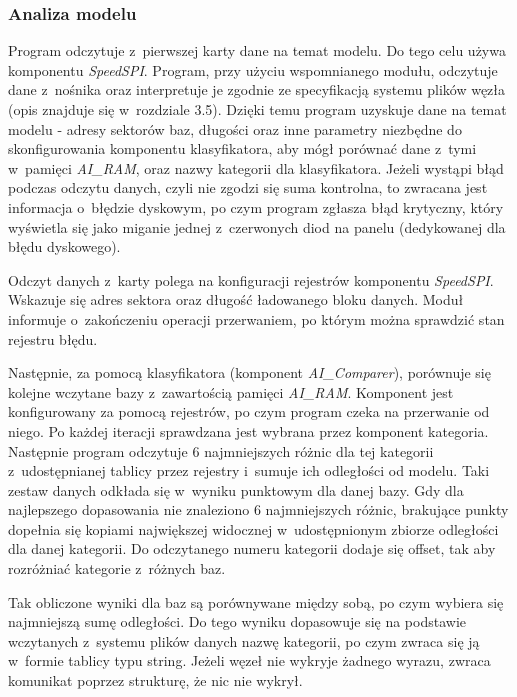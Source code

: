 \subsubsection{Analiza modelu}

Program odczytuje z~pierwszej karty dane na temat modelu. Do tego celu używa komponentu \textit{SpeedSPI}. Program, przy użyciu wspomnianego modułu, odczytuje dane z~nośnika oraz interpretuje je zgodnie ze specyfikacją systemu plików węzła (opis znajduje się w~rozdziale 3.5). Dzięki temu program uzyskuje dane na temat modelu - adresy sektorów baz, długości oraz inne parametry niezbędne do skonfigurowania komponentu klasyfikatora, aby mógł porównać dane z~tymi w~pamięci \textit{AI\_RAM}, oraz nazwy kategorii dla klasyfikatora. Jeżeli wystąpi błąd podczas odczytu danych, czyli nie zgodzi się suma kontrolna, to zwracana jest informacja o~błędzie dyskowym, po czym program zgłasza błąd krytyczny, który wyświetla się jako miganie jednej z~czerwonych diod na panelu (dedykowanej dla błędu dyskowego).

Odczyt danych z~karty polega na konfiguracji rejestrów komponentu \textit{SpeedSPI}. Wskazuje się adres sektora oraz długość ładowanego bloku danych. Moduł informuje o~zakończeniu operacji przerwaniem, po którym można sprawdzić stan rejestru błędu.

Następnie, za pomocą klasyfikatora (komponent \textit{AI\_Comparer}), porównuje się kolejne wczytane bazy z~zawartością pamięci \textit{AI\_RAM}. Komponent jest konfigurowany za pomocą rejestrów, po czym program czeka na przerwanie od niego. Po każdej iteracji sprawdzana jest wybrana przez komponent kategoria. Następnie program odczytuje 6 najmniejszych różnic dla tej kategorii z~udostępnianej tablicy przez rejestry i~sumuje ich odległości od modelu. Taki zestaw danych odkłada się w~wyniku punktowym dla danej bazy. Gdy dla najlepszego dopasowania nie znaleziono 6 najmniejszych różnic, brakujące punkty dopełnia się kopiami największej widocznej w~udostępnionym zbiorze odległości dla danej kategorii. Do odczytanego numeru kategorii dodaje się offset, tak aby rozróżniać kategorie z~różnych baz.

Tak obliczone wyniki dla baz są porównywane między sobą, po czym wybiera się najmniejszą sumę odległości. Do tego wyniku dopasowuje się na podstawie wczytanych z~systemu plików danych nazwę kategorii, po czym zwraca się ją w~formie tablicy typu string. Jeżeli węzeł nie wykryje żadnego wyrazu, zwraca komunikat poprzez strukturę, że nic nie wykrył.


